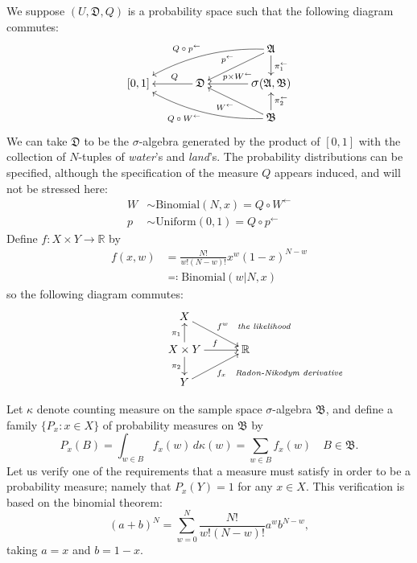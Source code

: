 \documentclass[
twoside=true,
paper=letter,
fontsize=11pt,
pagesize=auto,
leqno,
openany,
headsepline,
overfullrule,
]{scrbook}
\theoremstyle{plain}
\theoremstyle{plain}
\theoremstyle{definition}
\theoremstyle{bfnoteitalic}
\theoremstyle{bfnoteroman}
\newcommand{\sigalg}[1]{\mathfrak{#1}}
\newcommand{\defines}{\eqqcolon}
\newcommand{\sagb}{\mathop{\hbox{\large{$\sigma$}}}\nolimits}
\newcommand{\textsigma}{\hbox{\large{$\sigma$}}\kern-1pt}
\newcommand{\preimage}[1]{#1^{\leftarrow}}
\newcommand{\R}{\mathbb{R}}
\newcommand{\productsig}[2]{\sagb(#1,#2)}
\newcommand{\function}{f}
\newcommand{\measurespace}{X}
\newcommand{\measurespaceii}{Y}
\newcommand{\setii}{B}
\newcommand{\projectionone}{\pi_1}
\newcommand{\projectiontwo}{\pi_2}
\newcommand{\pspace}{\measurespace}%
\newcommand{\sspace}{\measurespaceii}%
\newcommand{\pspaceelt}{x}
\newcommand{\sspacesig}{\sigalg{B}}
\newcommand{\pspacesig}{\sigalg{A}}
\begin{document}
We suppose $(U,\sigalg{D},Q)$ is a probability space such that the following diagram commutes:
\[
\xymatrix@R=16pt@C=35pt{
 & & \pspacesig
 \ar@/_10pt/[dll]_{\makebox[0pt][r] {\scriptsize{$Q\circ\preimage{p}$}} }
 \ar[dl]_{\makebox[0pt][r]{\scriptsize{$\preimage{p}$}}}
 \ar[d]^{\preimage{\projectionone}}
 \\
 [0,1] & \sigalg{D} \ar[l]_-{\ Q} &
 \productsig{\pspacesig}{\sspacesig}
 \ar[l]_{\ \preimage{p\times W}}
 \\
 & & \sspacesig
  \ar[u]_{\preimage{\projectiontwo}}
  \ar[ul]^{\makebox[0pt][r]{\scriptsize{$\preimage{W}$}}}
  \ar@/^10pt/[ull]^{\makebox[0pt][r] {\scriptsize{$Q\circ\preimage{W}$}} }
  \\
}
\]
We can take $\sigalg{D}$ to be the \textsigma-algebra generated by
the product of $[0,1]$ with the collection of $N$-tuples of \textit{water}'s and \textit{land}'s.
The probability distributions can be specified, although the specification of the measure $Q$ appears induced, and will not be stressed here:
\begin{align*}
W & \sim \text{Binomial}(N, \pspaceelt) = Q\circ \preimage{W}\\
p & \sim \text{Uniform}(0, 1) = Q\circ \preimage{p}
\end{align*}
Define $\function:\pspace \times \sspace \to\R$ by
\begin{align*}
\function(\pspaceelt,w)
& =
\frac{N!}
{w!(N-w)!}
\pspaceelt^w(1-\pspaceelt)^{N-w} \\
& \defines
\text{Binomial}(w\vert N,\pspaceelt)
\end{align*}
so the following diagram commutes:
\[
\xymatrix@R=16pt@C=30pt{ 
\pspace
\ar[dr]^{\makebox[0pt][l]{\scriptsize{$\function^w$\quad\emph{the likelihood}}}}
& \\
\pspace\times\sspace 
\ar[u]^{\projectionone}
\ar[d]_{\projectiontwo}
\ar[r]^{\function}
& \R \\
\sspace 
\ar[ur]_{\makebox[0pt][l]{\scriptsize{$\function_x$\quad\emph{Radon-Nikodym derivative}}}}
& 
}
\]

Let $\kappa$ denote counting measure on the sample space \textsigma-algebra $\sspacesig$,
and define a family $\{P_\pspaceelt :\pspaceelt\in \pspace \}$ of probability measures on
$\sspacesig$ by
\[
P_\pspaceelt{(\setii)} =
\int_{w\in\setii}\function_\pspaceelt(w)\,d\kappa(w) =
\sum_{w\in\setii}\function_\pspaceelt(w)
\quad \setii\in\sspacesig.
\]
Let us verify one of the requirements that a measure must satisfy in order to be a probability measure; namely that
$P_\pspaceelt(\sspace)=1$ for any $\pspaceelt\in\pspace$. This verification is based on the binomial theorem:
\[
(a+b)^N=\sum_{w=0}^N
\frac{N!}
{w!(N-w)!}
a^w b^{N-w},
\]
taking $a=\pspaceelt$ and $b=1-\pspaceelt$.
\end{document}
